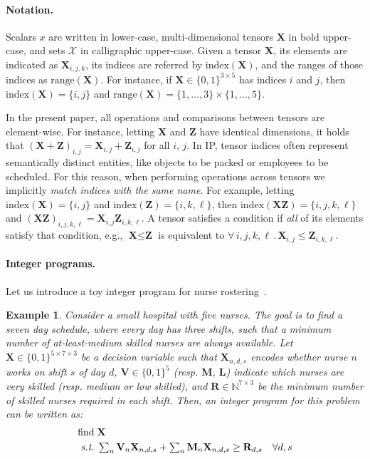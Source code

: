 \documentclass{article}
\newtheorem*{example}{Example}
\newcommand{\IDX}[1]{\ensuremath{\mathrm{index}\left(#1\right)}\xspace}
\newcommand{\RAN}[1]{\ensuremath{\mathrm{range}\left(#1\right)}\xspace}
\DeclareMathOperator*{\find}{find}
\renewcommand\[{\begin{equation}}
\renewcommand\]{\end{equation}}
\newcommand{\TL}{\textbf{L}\xspace}
\newcommand{\TM}{\textbf{M}\xspace}
\newcommand{\TR}{\textbf{R}\xspace}
\newcommand{\TV}{\textbf{V}\xspace}
\newcommand{\TX}{\textbf{X}\xspace}
\newcommand{\TZ}{\textbf{Z}\xspace}
\begin{document}
\paragraph{Notation.} Scalars $x$ are written in lower-case, multi-dimensional
tensors $\TX$ in bold upper-case, and sets $\mathcal{X}$ in calligraphic
upper-case.  Given a tensor \TX, its elements are indicated as $\TX_{i,j,k}$, its indices are referred by $\IDX{\TX}$, and the ranges of those
indices as $\RAN{\TX}$.  For instance, if $\TX \in \{0,1\}^{3 \times 5}$ has indices $i$ and
$j$, then $\IDX{\TX} = \{i, j\}$ and $\RAN{\TX} = \{1, \ldots, 3\} \times \{1,
\ldots, 5\}$.

In the present paper, all operations and comparisons between tensors are
element-wise.  For instance, letting \TX and \TZ have identical dimensions,
it holds that $(\TX + \TZ)_{i,j} = \TX_{i,j} + \TZ_{i,j}$ for all $i$, $j$.
%
In IP, tensor indices often represent semantically distinct entities,
like objects to be packed or employees to be scheduled.  For this reason, when
performing operations across tensors we implicitly \emph{match indices with the
same name}.  For example, letting $\IDX{\TX}=\{i,j\}$ and
$\IDX{\TZ}=\{i,k,\ell\}$, then $\IDX{\TX \TZ} = \{i, j, k, \ell\}$ and $(\TX
\TZ)_{i,j,k,\ell} = \TX_{i,j} \TZ_{i,k,\ell}$.
%
A tensor satisfies a condition if \emph{all} of its elements satisfy that
condition, e.g., $\TX \le \TZ$ is equivalent to $\forall \, i, j, k, \ell \,.\,
\TX_{i,j} \le \TZ_{i,k,\ell}$.
%


\paragraph{Integer programs.}  Let us introduce a toy integer program for nurse
rostering~\cite{burke2004state,smet2013nurse}.

\begin{example}
    Consider a small hospital with five nurses.  The goal is to find a seven
    day schedule, where every day has three shifts, such that a minimum number
    of at-least-medium skilled nurses are always available.
    Let $\TX \in \{0, 1\}^{5 \times 7 \times 3}$ be a decision variable such
    that $\TX_{n,d,s}$ encodes whether nurse $n$ works on shift $s$ of day $d$,
    $\TV \in \{0, 1\}^5$ (resp. $\TM$, $\TL$) indicate which nurses are very
    skilled (resp. medium or low skilled), and $\TR \in \mathbb{N}^{7 \times
    3}$ be the minimum number of skilled nurses required in each shift.
    Then, an integer program for this problem can be written as:
    \begin{align}
        \find
            & \; \TX \nonumber
        \\
        \text{\emph{s.t.}}
            & \textstyle \; \sum_n \TV_n \TX_{n,d,s} + \sum_n \TM_n \TX_{n,d,s} \ge \TR_{d,s}
            & \forall d, s
            \label{eq:toyconst1}
    \end{align}
\end{example}
\end{document}
